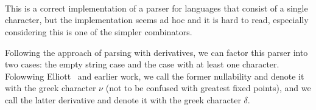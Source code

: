 \begin{code}%
%
\>[4]\AgdaSpace{}%
\AgdaSymbol{:}\AgdaSpace{}%
\AgdaSymbol{(}\AgdaSpace{}%
\AgdaSymbol{:}\AgdaSpace{}%
\AgdaSymbol{)}\AgdaSpace{}%
\AgdaSpace{}%
\AgdaSpace{}%
\AgdaSymbol{(}\AgdaSpace{}%
\AgdaSymbol{)}\<%
\\
%
\>[4]\AgdaSymbol{(}\AgdaSpace{}%
\AgdaSymbol{\AgdaUnderscore{})}\AgdaSpace{}%
\AgdaInductiveConstructor{[]}\AgdaSpace{}%
\AgdaSymbol{=}\AgdaSpace{}%
\AgdaSpace{}%
\AgdaSpace{}%
\AgdaSymbol{()}\<%
\\
%
\>[4]\AgdaSymbol{(}\AgdaSpace{}%
\AgdaSymbol{)}\AgdaSpace{}%
\AgdaSymbol{(}\AgdaSpace{}%
\AgdaSpace{}%
\AgdaInductiveConstructor{[]}\AgdaSymbol{)}\AgdaSpace{}%
\AgdaSymbol{=}\AgdaSpace{}%
\AgdaSpace{}%
\AgdaSymbol{(}\AgdaSpace{}%
\AgdaSpace{}%
\AgdaSymbol{\{}\AgdaSpace{}%
\AgdaSpace{}%
\AgdaSpace{}%
\AgdaSpace{}%
\AgdaSymbol{\})}\AgdaSpace{}%
\AgdaSpace{}%
\AgdaSymbol{\{}\AgdaSpace{}%
\AgdaSpace{}%
\AgdaSpace{}%
\AgdaSpace{}%
\AgdaSymbol{\}))}\AgdaSpace{}%
\AgdaSymbol{(}\AgdaSpace{}%
\AgdaSpace{}%
\AgdaSymbol{)}\<%
\\
%
\>[4]\AgdaSymbol{(}\AgdaSpace{}%
\AgdaSymbol{\AgdaUnderscore{})}\AgdaSpace{}%
\AgdaSymbol{(\AgdaUnderscore{}}\AgdaSpace{}%
\AgdaSpace{}%
\AgdaSymbol{\AgdaUnderscore{}}\AgdaSpace{}%
\AgdaSpace{}%
\AgdaSymbol{\AgdaUnderscore{})}\AgdaSpace{}%
\AgdaSymbol{=}\AgdaSpace{}%
\AgdaSpace{}%
\AgdaSpace{}%
\AgdaSymbol{()}\<%
\end{code}

This is a correct implementation of a parser for languages that consist of a single character, but the implementation seems ad hoc and it is hard to read, especially considering this is one of the simpler combinators.

Following the approach of parsing with derivatives, we can factor this parser into two cases: the empty string case and the case with at least one character. Folowwing Elliott~\cite{conal-languages} and earlier work, we call the former nullability and denote it with the greek character $ν$ (not to be confused with greatest fixed points), and we call the latter derivative and denote it with the greek character $δ$. 

